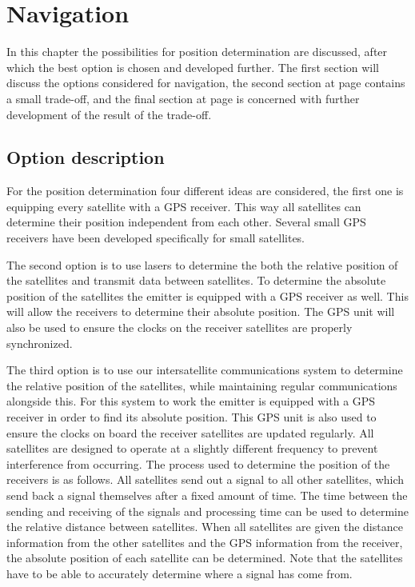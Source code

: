 \section{Navigation}
\label{NaviReceiver}
In this chapter the possibilities for position determination are discussed, after which the best option is chosen and developed further. The first section will discuss the options considered for navigation, the second section at page \pageref{navi2} contains a small trade-off, and the final section at page \pageref{navi3} is concerned with further development of the result of the trade-off.

\subsection{Option description}
\label{navi1}
For the position determination four different ideas are considered, the first one is equipping every satellite with a \acs{GPS} receiver. This way all satellites can determine their position independent from each other. Several small \acs{GPS} receivers have been developed specifically for small satellites.

The second option is to use lasers to determine the both the relative position of the satellites and transmit data between satellites. To determine the absolute position of the satellites the emitter is equipped with a \acs{GPS} receiver as well. This will allow the receivers to determine their absolute position. The \acs{GPS} unit will also be used to ensure the clocks on the receiver satellites are properly synchronized.

The third option is to use our intersatellite communications system to determine the relative position of the satellites, while maintaining regular communications alongside this. For this system to work the emitter is equipped with a GPS receiver in order to find its absolute position. This GPS unit is also used to ensure the clocks on board the receiver satellites are updated regularly. All satellites are designed to operate at a slightly different frequency to prevent interference from occurring. 
The process used to determine the position of the receivers is as follows. All satellites send out a signal to all other satellites, which send back a signal themselves after a fixed amount of time. The time between the sending and receiving of the signals and processing time can be used to determine the relative distance between satellites. When all satellites are given the distance information from the other satellites and the GPS information from the receiver, the absolute position of each satellite can be determined. Note that the satellites have to be able to accurately determine where a signal has come from.

